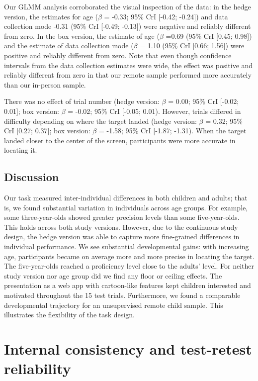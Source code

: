 \documentclass[
  man,floatsintext]{apa7}
\begin{document}
Our GLMM analysis corroborated the visual inspection of the data: in the hedge version, the estimates for age (\(\beta\) = -0.33; 95\% CrI {[}-0.42; -0.24{]}) and data collection mode -0.31 (95\% CrI {[}-0.49; -0.13{]}) were negative and reliably different from zero.
In the box version, the estimate of age (\(\beta\) =0.69 (95\% CrI {[}0.45; 0.98{]}) and the estimate of data collection mode (\(\beta\) = 1.10 (95\% CrI {[}0.66; 1.56{]}) were positive and reliably different from zero.
Note that even though confidence intervals from the data collection estimates were wide, the effect was positive and reliably different from zero in that our remote sample performed more accurately than our in-person sample.

There was no effect of trial number (hedge version: \(\beta\) = 0.00; 95\% CrI {[}-0.02; 0.01{]}; box version: \(\beta\) = -0.02; 95\% CrI {[}-0.05; 0.01).
However, trials differed in difficulty depending on where the target landed (hedge version: \(\beta\) = 0.32; 95\% CrI {[}0.27; 0.37{]}; box version: \(\beta\) = -1.58; 95\% CrI {[}-1.87; -1.31).
When the target landed closer to the center of the screen, participants were more accurate in locating it.

\hypertarget{discussion}{%
\subsection{Discussion}\label{discussion}}

Our task measured inter-individual differences in both children and adults; that is, we found substantial variation in individuals across age groups.
For example, some three-year-olds showed greater precision levels than some five-year-olds.
This holds across both study versions.
However, due to the continuous study design, the hedge version was able to capture more fine-grained differences in individual performance.
We see substantial developmental gains: with increasing age, participants became on average more and more precise in locating the target.
The five-year-olds reached a proficiency level close to the adults' level.
For neither study version nor age group did we find any floor or ceiling effects.
The presentation as a web app with cartoon-like features kept children interested and motivated throughout the 15 test trials.
Furthermore, we found a comparable developmental trajectory for an unsupervised remote child sample.
This illustrates the flexibility of the task design.

\hypertarget{internal-consistency-and-test-retest-reliability}{%
\section{Internal consistency and test-retest reliability}\label{internal-consistency-and-test-retest-reliability}}
\end{document}
